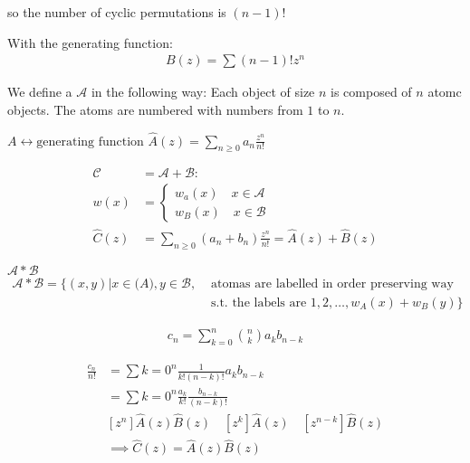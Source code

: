 so the number of cyclic permutations is $(n-1)!$

With the generating function: 
\begin{align*}
    B(z) = \sum (n-1)! z^n
\end{align*}

\begin{definition}
We define a  $\mathcal{A}$ in the following way: Each object of size $n$ is composed of $n$ atomc objects. The atoms are numbered with numbers from $1$ to $n$. 
\end{definition}
$A \leftrightarrow \text{generating function } \hat{A}(z) = \sum_{n\geq 0} a_n \frac{z^n}{n!}$

\begin{align*}
    \mathcal{C} &= \mathcal{A}+\mathcal{B}: \\
         w(x) &= \begin{cases}
                w_a(x) \quad x\in \mathcal{A}\\
                w_B(x) \quad x\in \mathcal{B}
				\end{cases}\\
    \hat{C}(z) &= \sum_{n\geq 0} (a_n+b_n) \frac{z^n}{n!}
        = \hat{A}(z) + \hat{B}(z)
\end{align*}

\begin{definition}

$\mathcal{A} * \mathcal{B}$ \\
\begin{align*}
  \mathcal{A} * \mathcal{B} = \{ (x,y) | x \in \mathcal(A), y \in \mathcal{B}, 
    &\text{ atomas are labelled in order preserving way }\\
    &\text{ s.t. the labels are } 1,2, \dotsc , w_A(x) + w_B(y) \}
\end{align*}


\end{definition}

\begin{align*}
    c_n = \sum_{k=0}^{n} {n \choose k} a_k b_{n-k}
\end{align*}


\begin{align*}
    \frac{c_n}{n!} &= \sum{k=0}^{n} \frac{1}{k!(n-k)!} a_k b_{n-k}\\
    &= \sum{k=0}^{n} \frac{a_k}{k!} \frac{b_{n-k}}{(n-k)!} \\
    &[z^n] \hat{A}(z)\hat{B}(z) 
        \quad [z^k] \hat{A}(z) 
        \quad [z^{n-k}] \hat{B}(z) \\
    &\implies \hat{C}(z) = \hat{A}(z) \hat{B}(z) \\
\end{align*}

